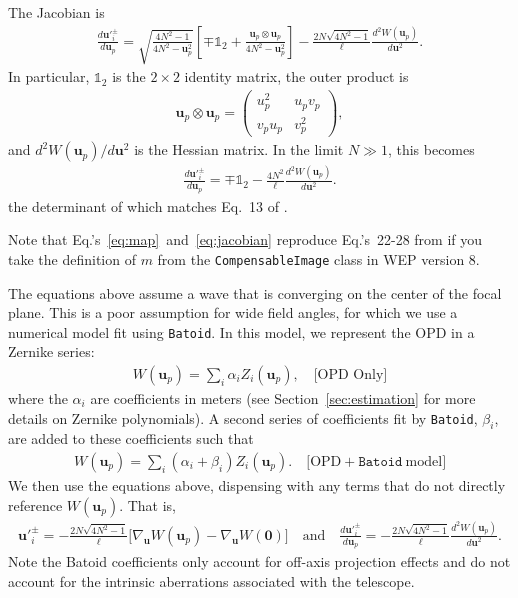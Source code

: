 \documentclass[TS,authoryear,toc]{lsstdoc}
\begin{document}
The Jacobian is
\begin{align}
    \frac{d\mathbf{u'}_{\!i}^\pm}{d\mathbf{u}_p} = 
    \sqrt{\frac{4N^2 - 1}{4N^2 - \mathbf{u}_p^2}} \left[
        \mp \mathds{1}_2 + \frac{\mathbf{u}_p \otimes \mathbf{u}_p}{4N^2 - \mathbf{u}_p^2}
    \right] - \frac{2N \sqrt{4N^2 - 1}}{\ell} \frac{d^2 W(\mathbf{u}_p)}{d \mathbf{u}^2}.
    \label{eq:jacobian}
\end{align}
In particular, $\mathds{1}_2$ is the $2 \times 2$ identity matrix, the outer product is
\begin{align}
    \mathbf{u}_p \otimes \mathbf{u}_p = 
    \begin{pmatrix}
        u_p^2   & u_p v_p \\
        v_p u_p & v_p^2
    \end{pmatrix},
\end{align}
and $d^2 W(\mathbf{u}_p) / d \mathbf{u}^2$ is the Hessian matrix.
In the limit $N \gg 1$, this becomes
\begin{align}
    \frac{d\mathbf{u'}_{\!i}^\pm}{d\mathbf{u}_p} = \mp \mathds{1}_2 - \frac{4 N^2}{\ell} \frac{d^2 W(\mathbf{u}_p)}{d \mathbf{u}^2}.
\end{align}
the determinant of which matches Eq.~13 of \citet{1993JOSAA..10.2277R}.

Note that Eq.'s~\ref{eq:map}~and~\ref{eq:jacobian} reproduce Eq.'s~22-28 from \citet{2015ApOpt..54.9045X} if you take the definition of $m$ from the \texttt{CompensableImage} class in WEP version 8.

The equations above assume a wave that is converging on the center of the focal plane.
This is a poor assumption for wide field angles, for which we use a numerical model fit using \texttt{Batoid}.
In this model, we represent the OPD in a Zernike series:
\begin{align}
  W(\mathbf{u}_p) = \sum_i \alpha_i Z_i(\mathbf{u}_p),
  \quad \big[ \text{OPD Only} \big]
\end{align}
where the $\alpha_i$ are coefficients in meters (see Section~\ref{sec:estimation} for more details on Zernike polynomials).
A second series of coefficients fit by \texttt{Batoid}, $\beta_i$, are added to these coefficients such that
\begin{align}
  W(\mathbf{u}_p) = \sum_i (\alpha_i + \beta_i) Z_i(\mathbf{u}_p).
  \quad \big[ \text{OPD} + \texttt{Batoid}~\text{model} \big]
\end{align}
We then use the equations above, dispensing with any terms that do not directly reference $W(\mathbf{u}_p)$.
That is, 
\begin{align}
  \mathbf{u'}_{\!i}^\pm = - \frac{2 N \sqrt{4 N^2 - 1}}{\ell} \Big[ \nabla_\mathbf{u} W(\mathbf{u}_p) - \nabla_\mathbf{u} W(\mathbf{0}) \Big]
  \quad \text{and} \quad
  \frac{d\mathbf{u'}_{\!i}^\pm}{d\mathbf{u}_p} = - \frac{2N \sqrt{4N^2 - 1}}{\ell} \frac{d^2 W(\mathbf{u}_p)}{d \mathbf{u}^2}.
\end{align}
Note the Batoid coefficients only account for off-axis projection effects and do not account for the intrinsic aberrations associated with the telescope.
\end{document}
